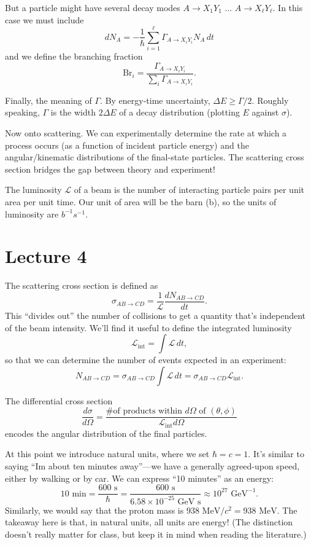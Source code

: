 \documentclass[../p164main.tex]{subfiles}
\begin{document}
But a particle might have several decay modes $A \to X_1 Y_1$ ... $A \to X_\ell Y_\ell$.
In this case we must include
\[ dN_A = -\frac{1}{\hbar} \sum_{i=1}^{\ell} \Gamma_{A \to X_i Y_i} N_A \,dt \]
and we define the branching fraction
\[ \textrm{Br}_i = \frac{\Gamma_{A \to X_i Y_i}}{\sum_{i}^{} \Gamma_{A \to X_i Y_i}}. \]

Finally, the meaning of $\Gamma$.
By energy-time uncertainty, $\Delta E \geq \Gamma / 2$.
Roughly speaking, $\Gamma$ is the width $2 \Delta E$ of a decay distribution (plotting $E$ against $\sigma$).

Now onto scattering.
We can experimentally determine the rate at which a process occurs (as a function of incident particle energy) and the angular/kinematic distributions of the final-state particles.
The scattering cross section bridges the gap between theory and experiment! %

The luminosity $\mathcal L$ of a beam is the number of interacting particle pairs per unit area per unit time.
Our unit of area will be the barn (b), so the units of luminosity are $b^{-1} s^{-1}$.

\section{Lecture 4}
The scattering cross section is defined as
\[ \sigma_{AB \to CD} = \frac{1}{\mathcal L} \frac{dN_{AB \to CD}}{dt}. \]
This ``divides out'' the number of collisions to get a quantity that's independent of the beam intensity.
We'll find it useful to define the integrated luminosity
\[ \mathcal L_\text{int} = \int \mathcal L \,dt, \]
so that we can determine the number of events expected in an experiment:
\[ N_{AB \to CD} = \sigma_{AB \to CD} \int \mathcal L \,dt = \sigma_{AB \to CD} \mathcal L_\text{int}. \]

The differential cross section
\[ \frac{d\sigma}{d\Omega} = \frac{\text{\# of products within $d\Omega$ of $(\theta,\phi)$}}{\mathcal L_\text{int} d\Omega} \]
encodes the angular distribution of the final particles.

At this point we introduce natural units, where we set $\hbar = c = 1$.
It's similar to saying ``Im about ten minutes away''---we have a generally agreed-upon speed, either by walking or by car.
We can express ``10 minutes'' as an energy:
\[ 10 \text{ min} = \frac{600 \text{ s}}{\hbar} = \frac{600 \text{ s}}{6.58 \times 10^{-25} \text{ GeV s}} \approx 10^{27} \text{ GeV}^{-1}. \]
Similarly, we would say that the proton mass is $938 \text{ MeV} / c^2 = 938 \text{ MeV}$.
The takeaway here is that, in natural units, all units are energy!
(The distinction doesn't really matter for class, but keep it in mind when reading the literature.)
\end{document}
